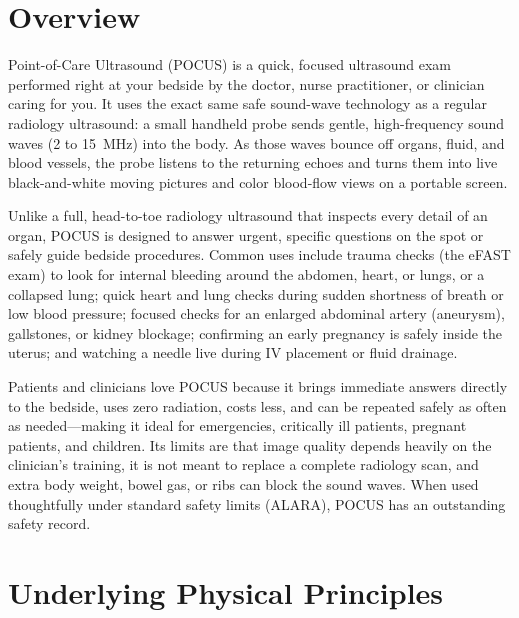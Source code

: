 \label{ch:infographic-pocus}

\section{Overview}

Point-of-Care Ultrasound (POCUS) is a quick, focused ultrasound exam performed right at your bedside by the doctor, nurse practitioner, or clinician caring for you. It uses the exact same safe sound-wave technology as a regular radiology ultrasound: a small handheld probe sends gentle, high-frequency sound waves (2 to 15~MHz) into the body. As those waves bounce off organs, fluid, and blood vessels, the probe listens to the returning echoes and turns them into live black-and-white moving pictures and color blood-flow views on a portable screen.

Unlike a full, head-to-toe radiology ultrasound that inspects every detail of an organ, POCUS is designed to answer urgent, specific questions on the spot or safely guide bedside procedures. Common uses include trauma checks (the eFAST exam) to look for internal bleeding around the abdomen, heart, or lungs, or a collapsed lung; quick heart and lung checks during sudden shortness of breath or low blood pressure; focused checks for an enlarged abdominal artery (aneurysm), gallstones, or kidney blockage; confirming an early pregnancy is safely inside the uterus; and watching a needle live during IV placement or fluid drainage.

Patients and clinicians love POCUS because it brings immediate answers directly to the bedside, uses zero radiation, costs less, and can be repeated safely as often as needed---making it ideal for emergencies, critically ill patients, pregnant patients, and children. Its limits are that image quality depends heavily on the clinician's training, it is not meant to replace a complete radiology scan, and extra body weight, bowel gas, or ribs can block the sound waves. When used thoughtfully under standard safety limits (ALARA), POCUS has an outstanding safety record.

\section{Underlying Physical Principles}

